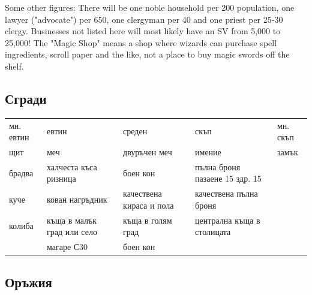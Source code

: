 Some other figures: There will be one noble household per 200 population, one lawyer ("advocate") per 650, one clergyman per 40 and one priest per 25-30 clergy. Businesses not listed here will most likely have an SV from 5,000 to 25,000! The "Magic Shop" means a shop where wizards can purchase spell ingredients, scroll paper and the like, not a place to buy magic swords off the shelf. 

\subsection{Сгради}
\begin{tabular}{p{3cm} | p{3cm} | p{3cm} | p{3cm} | p{3cm}}
мн. евтин & евтин                                   & среден                   & скъп                           & мн. скъп  \\
щит       & меч                                     & двуръчен меч             & имение                         & замък     \\
брадва    & халчеста къса ризница                   & боен кон                 & пълна броня пазаене 15 здр. 15 &           \\
куче      & кован нагръдник                         & качествена кираса и пола & качествена пълна броня         &           \\
колиба    & къща в малък град или село              & къща в голям град        & централна къща в столицата                 \\
          & магаре С30                              & боен кон                 &
\end{tabular}


\subsection{Оръжия}
\newcommand{\weapon}[8]
{
\begin{multicols}{2}
\noindent #2 \\
Необходима сила: #3  \\
Обсег: #4  \\
Щети: #5  \\
Свойства: #6  \\
Маса: #7  \\
Стойност: #8  \\
\texttt{[image: ../images/\#1]}~
\end{multicols}
}

